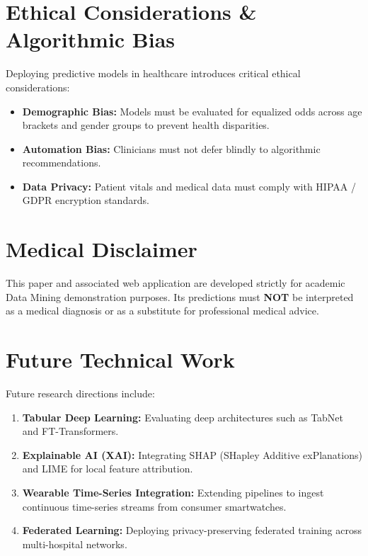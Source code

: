 \section{Ethical Considerations \& Algorithmic Bias}
Deploying predictive models in healthcare introduces critical ethical considerations:
\begin{itemize}
    \item \textbf{Demographic Bias:} Models must be evaluated for equalized odds across age brackets and gender groups to prevent health disparities.
    \item \textbf{Automation Bias:} Clinicians must not defer blindly to algorithmic recommendations.
    \item \textbf{Data Privacy:} Patient vitals and medical data must comply with HIPAA / GDPR encryption standards.
\end{itemize}

\section{Medical Disclaimer}
\begin{tcolorbox}[colback=red!10!white,colframe=red!75!black,title=\textbf{MEDICAL DISCLAIMER}]
This paper and associated web application are developed strictly for academic Data Mining demonstration purposes. Its predictions must \textbf{NOT} be interpreted as a medical diagnosis or as a substitute for professional medical advice.
\end{tcolorbox}

\section{Future Technical Work}
Future research directions include:
\begin{enumerate}
    \item \textbf{Tabular Deep Learning:} Evaluating deep architectures such as TabNet and FT-Transformers.
    \item \textbf{Explainable AI (XAI):} Integrating SHAP (SHapley Additive exPlanations) and LIME for local feature attribution.
    \item \textbf{Wearable Time-Series Integration:} Extending pipelines to ingest continuous time-series streams from consumer smartwatches.
    \item \textbf{Federated Learning:} Deploying privacy-preserving federated training across multi-hospital networks.
\end{enumerate}
